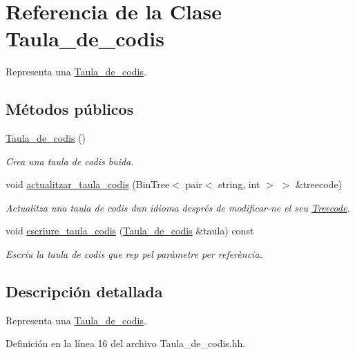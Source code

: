\hypertarget{class_taula__de__codis}{}\section{Referencia de la Clase Taula\+\_\+de\+\_\+codis}
\label{class_taula__de__codis}


Representa una \hyperlink{class_taula__de__codis}{Taula\+\_\+de\+\_\+codis}.  


\subsection*{Métodos públicos}
\begin{DoxyCompactItemize}
\item 
\hyperlink{class_taula__de__codis_a68461878363b3b3e084215085cc264e5}{Taula\+\_\+de\+\_\+codis} ()
\begin{DoxyCompactList}\small\item\em Crea una taula de codis buida. \end{DoxyCompactList}\item 
void \hyperlink{class_taula__de__codis_a290a2b377c70c88326dfa0d8b10b0c57}{actualitzar\+\_\+taula\+\_\+codis} (Bin\+Tree$<$ pair$<$ string, int $>$ $>$ \&treecode)
\begin{DoxyCompactList}\small\item\em Actualitza una taula de codis d\textquotesingle{}un idioma després de modificar-\/ne el seu \hyperlink{class_treecode}{Treecode}. \end{DoxyCompactList}\item 
void \hyperlink{class_taula__de__codis_a535e14648f1a4f3799d4204d4819a78f}{escriure\+\_\+taula\+\_\+codis} (\hyperlink{class_taula__de__codis}{Taula\+\_\+de\+\_\+codis} \&taula) const
\begin{DoxyCompactList}\small\item\em Escriu la taula de codis que rep pel paràmetre per referència. \end{DoxyCompactList}\end{DoxyCompactItemize}


\subsection{Descripción detallada}
Representa una \hyperlink{class_taula__de__codis}{Taula\+\_\+de\+\_\+codis}. 

Definición en la línea 16 del archivo Taula\+\_\+de\+\_\+codis.\+hh.



